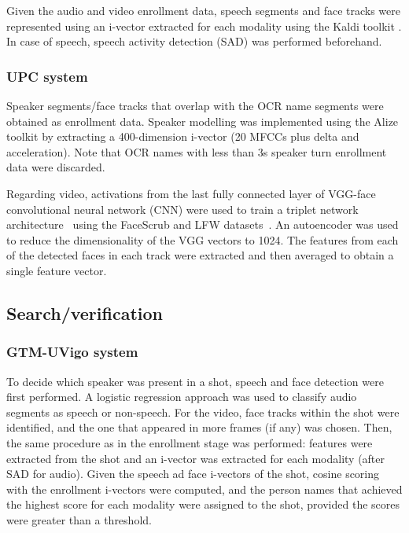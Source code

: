 Given the audio and video enrollment data, speech segments and face tracks were represented using  
an i-vector \cite{dehak10} extracted for each modality using the Kaldi toolkit \cite{kaldi}.
In case of speech, speech activity detection (SAD) was performed beforehand. 


\subsubsection{UPC system}
%
Speaker segments/face tracks that overlap with the OCR name segments were obtained as enrollment data. 
%
Speaker modelling was implemented using the Alize toolkit\cite{Bonastre1} 
by extracting a 400-dimension  i-vector \cite{dehak10} (20 MFCCs plus delta and acceleration). 
Note that OCR names with less than 3s speaker turn enrollment data were discarded.

Regarding video, activations from the last fully connected layer of VGG-face~\cite{parkhi15deep} convolutional neural network (CNN) 
were used to train a triplet network architecture~\cite{Schroff2015} using the FaceScrub and LFW datasets~\cite{huang2007lfw,ng2014data}. 
An autoencoder was used to reduce the dimensionality of the VGG vectors to 1024. 
The features from each of the detected faces in each track were extracted and then averaged to obtain a single feature vector.

\subsection{Search/verification}

\subsubsection{GTM-UVigo system}

To decide which speaker was present in a shot, speech and face detection were first  performed. 
A logistic regression approach was used to classify audio segments as speech or non-speech. 
%
For the video, face tracks within the shot were identified, and the one that appeared in more frames (if any) was chosen. 
%
Then, the same procedure as in the enrollment stage was performed: features were extracted from the shot
and an i-vector was extracted for each modality (after SAD for audio).
%
Given the speech ad face i-vectors of the shot, cosine scoring with the enrollment i-vectors were computed, 
and the person names that achieved the highest score for each modality were assigned to the shot, 
provided 
the scores were greater than a threshold.

